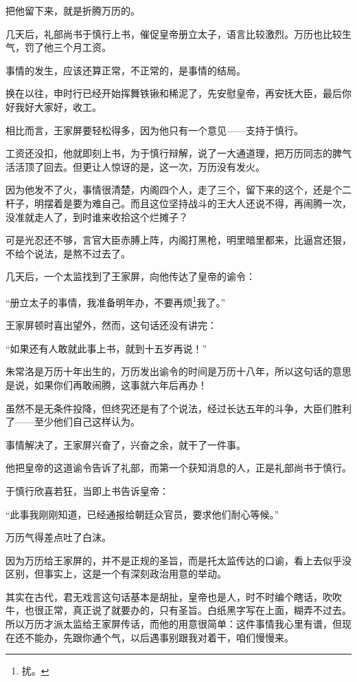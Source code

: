 \begin{multicols}{\theparacolNo}
把他留下来，就是折腾万历的。

几天后，礼部尚书于慎行上书，催促皇帝册立太子，语言比较激烈。万历也比较生气，罚了他三个月工资。

事情的发生，应该还算正常，不正常的，是事情的结局。

换在以往，申时行已经开始挥舞铁锹和稀泥了，先安慰皇帝，再安抚大臣，最后你好我好大家好，收工。

相比而言，王家屏要轻松得多，因为他只有一个意见——支持于慎行。

工资还没扣，他就即刻上书，为于慎行辩解，说了一大通道理，把万历同志的脾气活活顶了回去。但更让人惊讶的是，这一次，万历没有发火。

因为他发不了火，事情很清楚，内阁四个人，走了三个，留下来的这个，还是个二杆子，明摆着是要为难自己。而且这位坚持战斗的王大人还说不得，再闹腾一次，没准就走人了，到时谁来收拾这个烂摊子？

可是光忍还不够，言官大臣赤膊上阵，内阁打黑枪，明里暗里都来，比逼宫还狠，不给个说法，是熬不过去了。

几天后，一个太监找到了王家屏，向他传达了皇帝的谕令：

“册立太子的事情，我准备明年办，不要再烦\footnote{扰。}我了。”

王家屏顿时喜出望外，然而，这句话还没有讲完：

“如果还有人敢就此事上书，就到十五岁再说！”

朱常洛是万历十年出生的，万历发出谕令的时间是万历十八年，所以这句话的意思是说，如果你们再敢闹腾，这事就六年后再办！

虽然不是无条件投降，但终究还是有了个说法，经过长达五年的斗争，大臣们胜利了——至少他们自己这样认为。

事情解决了，王家屏兴奋了，兴奋之余，就干了一件事。

他把皇帝的这道谕令告诉了礼部，而第一个获知消息的人，正是礼部尚书于慎行。

于慎行欣喜若狂，当即上书告诉皇帝：

“此事我刚刚知道，已经通报给朝廷众官员，要求他们耐心等候。”

万历气得差点吐了白沫。

因为万历给王家屏的，并不是正规的圣旨，而是托太监传达的口谕，看上去似乎没区别，但事实上，这是一个有深刻政治用意的举动。

其实在古代，君无戏言这句话基本是胡扯，皇帝也是人，时不时编个瞎话，吹吹牛，也很正常，真正说了就要办的，只有圣旨。白纸黑字写在上面，糊弄不过去。所以万历才派太监给王家屏传话，而他的用意很简单：这件事情我心里有谱，但现在还不能办，先跟你通个气，以后遇事别跟我对着干，咱们慢慢来。


\end{multicols}
